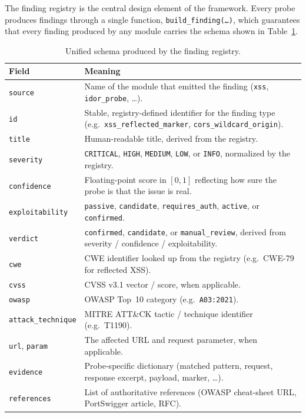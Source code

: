 The finding registry is the central design element of the framework. Every probe produces findings through a single function, \texttt{build\_finding(\dots)}, which guarantees that every finding produced by any module carries the schema shown in Table~\ref{tab:finding-schema}.

\begin{table}[h]
\centering
\small
\begin{tabular}{|l|p{10cm}|}
\hline
\textbf{Field} & \textbf{Meaning} \\
\hline
\texttt{source}       & Name of the module that emitted the finding (\texttt{xss}, \texttt{idor\_probe}, \dots). \\
\texttt{id}           & Stable, registry-defined identifier for the finding type (e.g.\ \texttt{xss\_reflected\_marker}, \texttt{cors\_wildcard\_origin}). \\
\texttt{title}        & Human-readable title, derived from the registry. \\
\texttt{severity}     & \texttt{CRITICAL}, \texttt{HIGH}, \texttt{MEDIUM}, \texttt{LOW}, or \texttt{INFO}, normalized by the registry. \\
\texttt{confidence}   & Floating-point score in $[0, 1]$ reflecting how sure the probe is that the issue is real. \\
\texttt{exploitability} & \texttt{passive}, \texttt{candidate}, \texttt{requires\_auth}, \texttt{active}, or \texttt{confirmed}. \\
\texttt{verdict}      & \texttt{confirmed}, \texttt{candidate}, or \texttt{manual\_review}, derived from severity / confidence / exploitability. \\
\texttt{cwe}          & CWE identifier looked up from the registry (e.g.\ CWE-79 for reflected XSS). \\
\texttt{cvss}         & CVSS v3.1 vector / score, when applicable. \\
\texttt{owasp}        & OWASP Top~10 category (e.g.\ \texttt{A03:2021}). \\
\texttt{attack\_technique} & MITRE ATT\&CK tactic / technique identifier (e.g.\ T1190). \\
\texttt{url}, \texttt{param} & The affected URL and request parameter, when applicable. \\
\texttt{evidence}     & Probe-specific dictionary (matched pattern, request, response excerpt, payload, marker, \dots). \\
\texttt{references}   & List of authoritative references (OWASP cheat-sheet URL, PortSwigger article, RFC). \\
\hline
\end{tabular}
\caption{Unified schema produced by the finding registry.}
\label{tab:finding-schema}
\end{table}

